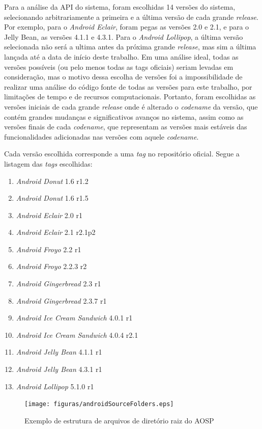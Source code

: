 Para a análise da API do sistema, foram escolhidas 14 versões do sistema, selecionando arbitrariamente a primeira e a última versão de cada grande \textit{release}. Por exemplo, para o \textit{Android Eclair}, foram pegas as versões 2.0 e 2.1, e para o Jelly Bean, as versões 4.1.1 e 4.3.1. Para o \textit{Android Lollipop}, a última versão selecionada não será a ultima antes da próxima grande \textit{release}, mas sim a última lançada até a data de início deste trabalho. Em uma análise ideal, todas as versões possíveis (ou pelo menos todas as tags oficiais) seriam levadas em consideração, mas o motivo dessa escolha de versões foi a impossibilidade de realizar uma análise do código fonte de todas as versões para este trabalho, por limitações de tempo e de recursos computacionais. Portanto, foram escolhidas as versões iniciais de cada grande \textit{release} onde é alterado o \textit{codename} da versão, que contém grandes mudanças e significativos avanços no sistema, assim como as versões finais de cada \textit{codename}, que representam as versões mais estáveis das funcionalidades adicionadas nas versões com aquele \textit{codename}.
 
Cada versão escolhida corresponde a uma \textit{tag} no repositório oficial. Segue a listagem das \textit{tags} escolhidas:
\begin{enumerate}
\item \textit{Android Donut} 1.6 r1.2
\item \textit{Android Donut} 1.6 r1.5
\item \textit{Android Eclair} 2.0 r1
\item \textit{Android Eclair} 2.1 r2.1p2
\item \textit{Android Froyo} 2.2 r1
\item \textit{Android Froyo} 2.2.3 r2
\item \textit{Android Gingerbread} 2.3 r1
\item \textit{Android Gingerbread} 2.3.7 r1
\item \textit{Android Ice Cream Sandwich} 4.0.1 r1
\item \textit{Android Ice Cream Sandwich} 4.0.4 r2.1
\item \textit{Android Jelly Bean} 4.1.1 r1
\item \textit{Android Jelly Bean} 4.3.1 r1
\item \textit{Android Lollipop} 5.1.0 r1
\end{enumerate}

\begin{figure}[!htb]
\centering
\texttt{[image: figuras/androidSourceFolders.eps]}
\caption{Exemplo de estrutura de arquivos de diretório raiz do AOSP}
\label{androidSourceFolders}
\end{figure}

